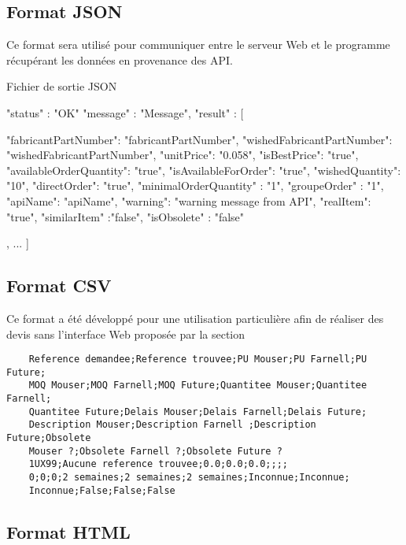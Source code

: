 {\subsection{Format JSON}

Ce format sera utilisé pour communiquer entre le serveur Web et le programme récupérant les données en provenance des API.

\begin{Python}{Fichier de sortie JSON}

{
    "status" : "OK"
    "message" : "Message",
    "result" : 
    [{
        "fabricantPartNumber": "fabricantPartNumber",
        "wishedFabricantPartNumber": "wishedFabricantPartNumber",
        "unitPrice": "0.058",
        "isBestPrice": "true",
        "availableOrderQuantity": "true",
        "isAvailableForOrder": "true",
        "wishedQuantity": "10",
        "directOrder": "true",
        "minimalOrderQuantity" : "1",
        "groupeOrder" : "1",
        "apiName": "apiName",
        "warning": "warning message from API",
        "realItem": "true",
        "similarItem" :"false",
        "isObsolete" : "false"
    
    },
    {...}
    ]
}

\end{Python}

\subsection{Format CSV}

Ce format a été développé pour une utilisation particulière afin de réaliser des devis sans l'interface Web proposée par la section 

\begin{verbatim}
    Reference demandee;Reference trouvee;PU Mouser;PU Farnell;PU Future;
    MOQ Mouser;MOQ Farnell;MOQ Future;Quantitee Mouser;Quantitee Farnell;
    Quantitee Future;Delais Mouser;Delais Farnell;Delais Future;
    Description Mouser;Description Farnell ;Description Future;Obsolete
    Mouser ?;Obsolete Farnell ?;Obsolete Future ?
    1UX99;Aucune reference trouvee;0.0;0.0;0.0;;;;
    0;0;0;2 semaines;2 semaines;2 semaines;Inconnue;Inconnue;
    Inconnue;False;False;False

\end{verbatim}



\subsection{Format HTML}

}
